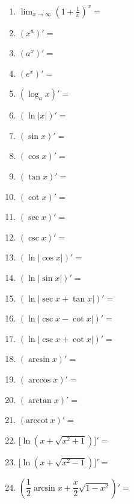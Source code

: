 \documentclass[a4paper,12pt]{article}
\begin{document}
    \pagestyle{empty}

    \begin{minipage}[t]{0.30\textwidth}
        \begin{enumerate}[leftmargin=*, itemsep=1.1em]
            \item $\displaystyle \lim_{x\to \infty} \left(1 + \frac{1}{x}\right)^x = $
            \item $(x^a)' =$

            \item $(a^x)' =$

            \item $(e^x)' =$

            \item $(\log_a x)' =$

            \item $(\ln |x|)' =$

            \item $(\sin x)' =$
            \item $(\cos x)' =$
            \item $(\tan x)' =$
            \item $(\cot x)' =$
            \item $(\sec x)' =$
            \item $(\csc x)' =$
            \item $(\ln|\cos x|)' =$
            \item $(\ln|\sin x|)' =$
            \item $(\ln|\sec x + \tan x|)' =$
            \item $(\ln|\csc x - \cot x|)'=$
            \item $(\ln|\csc x + \cot x|)'=$
            \item $(\arcsin x)' =$
            \item $(\arccos x)' =$
            \item $(\arctan x)' =$
            \item $(\mathrm{arccot}\ x)' =$

            \item $\bigl[\ln (x+\sqrt{x^2+1})\bigr]' =$

            \item $\bigl[\ln (x+\sqrt{x^2-1})\bigr]' =$
            \item $(\dfrac{1}{2}\arcsin x + \dfrac{x}{2}\sqrt{1 - x^2})' =$
        \end{enumerate}
    \end{minipage}
    \hfill
\end{document}
